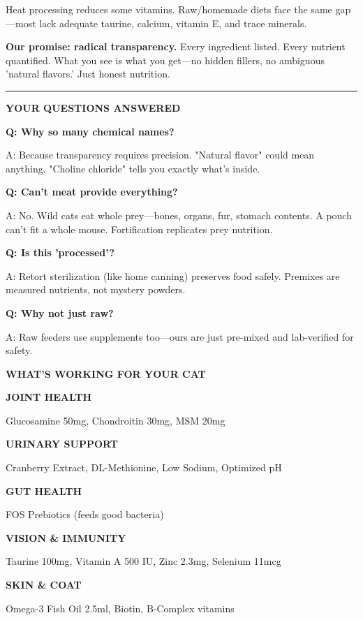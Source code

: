 \documentclass[10pt,a6paper,landscape]{article}
\begin{document}
\begin{multicols}{3}
{Heat processing reduces some vitamins. Raw/homemade diets face the same gap---most lack adequate taurine, calcium, vitamin E, and trace minerals.

\textbf{Our promise: radical transparency.} Every ingredient listed. Every nutrient quantified. What you see is what you get---no hidden fillers, no ambiguous 'natural flavors.' Just honest nutrition.
}

\vspace{3mm}
\hrule
\vspace{1mm}

{\small\bfseries YOUR QUESTIONS ANSWERED}

{\tiny
\textbf{Q: Why so many chemical names?}

A: Because transparency requires precision. "Natural flavor" could mean anything. "Choline chloride" tells you exactly what's inside.

\textbf{Q: Can't meat provide everything?}

A: No. Wild cats eat whole prey---bones, organs, fur, stomach contents. A pouch can't fit a whole mouse. Fortification replicates prey nutrition.

\textbf{Q: Is this 'processed'?}

A: Retort sterilization (like home canning) preserves food safely. Premixes are measured nutrients, not mystery powders.

\textbf{Q: Why not just raw?}

A: Raw feeders use supplements too---ours are just pre-mixed and lab-verified for safety.
}

\columnbreak

{\small\bfseries WHAT'S WORKING FOR YOUR CAT}

{\tiny
\textbf{JOINT HEALTH}

Glucosamine 50mg, Chondroitin 30mg, MSM 20mg

\textbf{URINARY SUPPORT}

Cranberry Extract, DL-Methionine, Low Sodium, Optimized pH

\textbf{GUT HEALTH}

FOS Prebiotics (feeds good bacteria)

\textbf{VISION \& IMMUNITY}

Taurine 100mg, Vitamin A 500 IU, Zinc 2.3mg, Selenium 11mcg

\textbf{SKIN \& COAT}

Omega-3 Fish Oil 2.5ml, Biotin, B-Complex vitamins

}
\end{multicols}
\end{document}
